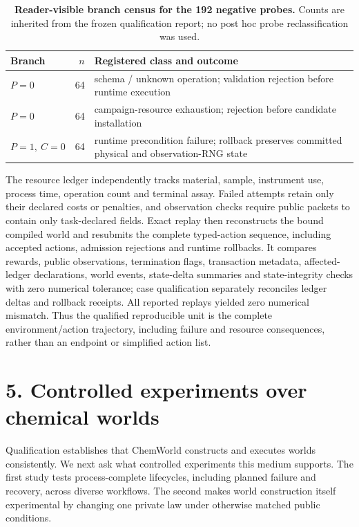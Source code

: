 \documentclass[10pt,twocolumn]{article}
\begin{document}
\begin{table}[!b]
\centering
\scriptsize
\caption{\textbf{Reader-visible branch census for the 192 negative probes.} Counts are inherited from the frozen qualification report; no post hoc probe reclassification was used.}
\label{tab:transaction-branch-census}
\begin{tabularx}{\columnwidth}{@{}L{0.16\columnwidth}rY@{}}
\toprule
Branch & $n$ & Registered class and outcome \\
\midrule
$P=0$ & 64 & schema / unknown operation; validation rejection before runtime execution \\
$P=0$ & 64 & campaign-resource exhaustion; rejection before candidate installation \\
$P=1,\ C=0$ & 64 & runtime precondition failure; rollback preserves committed physical and observation-RNG state \\
\bottomrule
\end{tabularx}
\end{table}

The resource ledger independently tracks material, sample, instrument
use, process time, operation count and terminal assay. Failed attempts
retain only their declared costs or penalties, and observation checks
require public packets to contain only task-declared fields. Exact
replay then reconstructs the bound compiled world and resubmits the
complete typed-action sequence, including accepted actions, admission
rejections and runtime rollbacks. It compares rewards, public
observations, termination flags, transaction metadata, affected-ledger
declarations, world events, state-delta summaries and state-integrity
checks with zero numerical tolerance; case qualification separately
reconciles ledger deltas and rollback receipts. All reported replays
yielded zero numerical mismatch. Thus the qualified reproducible unit is
the complete environment/action trajectory, including failure and
resource consequences, rather than an endpoint or simplified action
list.

\section{5. Controlled experiments over chemical
worlds}\label{controlled-experiments-over-chemical-worlds}

Qualification establishes that ChemWorld constructs and executes worlds
consistently. We next ask what controlled experiments this medium
supports. The first study tests process-complete lifecycles, including
planned failure and recovery, across diverse workflows. The second makes
world construction itself experimental by changing one private law under
otherwise matched public conditions.
\end{document}
